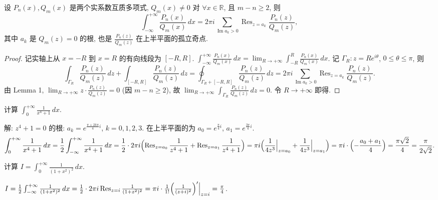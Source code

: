 \documentclass[theorem=false,mathfont=none,openany,sub3section]{easybook}
\begin{document}
\begin{theorem}
  设 $P_{n}(x),Q_{m}(x)$ 是两个实系数互质多项式, $Q_{m}(x)\neq0$ 对 $\forall x\in\mathbb{R}$, 且 $m-n\geq2$, 则
  \[
  \int_{-\infty}^{+\infty}\frac{P_{n}(x)}{Q_{m}(x)}\,dx
  =2\pi i\sum_{\operatorname{Im}a_{k}>0}\operatorname{Res}_{z=a_{k}}\frac{P_{n}(z)}{Q_{m}(z)},
  \]
  其中 $a_{k}$ 是 $Q_{m}(z)=0$ 的根, 也是 $\frac{P_{n}(z)}{Q_{m}(z)}$ 在上半平面的孤立奇点.
\end{theorem}

\begin{proof}
  记实轴上从 $x=-R$ 到 $x=R$ 的有向线段为 $[-R,R]$.
  $\int_{-\infty}^{+\infty}\frac{P_{n}(x)}{Q_{m}(x)}\,dx=\lim_{R\to+\infty}\int_{-R}^{R}\frac{P_{n}(x)}{Q_{m}(x)}\,dx$.
  记 $\Gamma_{R}:z=Re^{i\theta}$, $0\leq\theta\leq\pi$, 则
  \[
  \int_{\Gamma_{R}}\frac{P_{n}(z)}{Q_{m}(z)}\,dz+\int_{[-R,R]}\frac{P_{n}(z)}{Q_{m}(z)}\,dz
  =\oint_{\Gamma_{R}+[-R,R]}\frac{P_{n}(z)}{Q_{m}(z)}\,dz
  =2\pi i\sum_{\operatorname{Im}a_{k}>0}\operatorname{Res}_{z=a_{k}}\frac{P_{n}(z)}{Q_{m}(z)}.
  \]
  由 Lemma 1, $\lim_{R\to+\infty}z\cdot\frac{P_{n}(z)}{Q_{m}(z)}=0$ (因 $m-n\geq2$), 故 $\lim_{R\to+\infty}\int_{\Gamma_{R}}\frac{P_{n}(z)}{Q_{m}(z)}\,dz=0$. 令 $R\to+\infty$ 即得.
\end{proof}

\begin{example}
  计算 $\int_{0}^{+\infty}\frac{1}{x^{4}+1}\,dx$.\par
  解: $z^{4}+1=0$ 的根: $a_{k}=e^{\frac{\pi+2k\pi}{4}i}$, $k=0,1,2,3$. 在上半平面的为 $a_{0}=e^{\frac{\pi}{4}i}$, $a_{1}=e^{\frac{3\pi}{4}i}$.
  \[
  \int_{0}^{+\infty}\frac{1}{x^{4}+1}\,dx
  =\frac{1}{2}\int_{-\infty}^{+\infty}\frac{1}{x^{4}+1}\,dx
  =\frac{1}{2}\cdot2\pi i\Bigl(\operatorname{Res}_{z=a_{0}}\frac{1}{z^{4}+1}+\operatorname{Res}_{z=a_{1}}\frac{1}{z^{4}+1}\Bigr)
  =\pi i\Bigl(\frac{1}{4z^{3}}\Big|_{z=a_{0}}+\frac{1}{4z^{3}}\Big|_{z=a_{1}}\Bigr)
  =\pi i\cdot\Bigl(-\frac{a_{0}+a_{1}}{4}\Bigr)
  =\frac{\pi\sqrt{2}}{4}=\frac{\pi}{2\sqrt{2}}.
  \]
\end{example}

\begin{example}
  计算 $I=\int_{0}^{+\infty}\frac{1}{(1+x^{2})^{2}}\,dx$.

  $I=\frac{1}{2}\int_{-\infty}^{+\infty}\frac{1}{(1+x^{2})^{2}}\,dx
  =\frac{1}{2}\cdot2\pi i\operatorname*{Res}_{z=i}\frac{1}{(1+z^{2})^{2}}
  =\pi i\cdot\frac{1}{1!}\Bigl(\frac{1}{(z+i)^{2}}\Bigr)'\Big|_{z=i}=\frac{\pi}{4}$.
\end{example}
\end{document}
